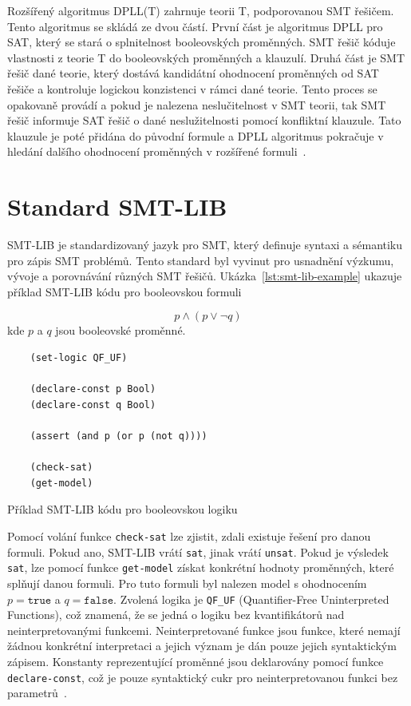 Rozšířený algoritmus DPLL(T) zahrnuje teorii T, podporovanou SMT řešičem.
Tento algoritmus se skládá ze dvou částí.
První část je algoritmus DPLL pro SAT, který se stará o splnitelnost booleovských proměnných.
SMT řešič kóduje vlastnosti z teorie T do booleovských proměnných a klauzulí.
Druhá část je SMT řešič dané teorie, který dostává kandidátní ohodnocení proměnných od SAT řešiče a kontroluje logickou konzistenci
v rámci dané teorie.
Tento proces se opakovaně provádí a pokud je nalezena neslučitelnost v SMT teorii,
tak SMT řešič informuje SAT řešič o dané neslužitelnosti pomocí konfliktní klauzule.
Tato klauzule je poté přidána do původní formule a DPLL algoritmus pokračuje v hledání dalšího ohodnocení proměnných
v rozšířené formuli~\cite{DPLLT}.




\section{Standard SMT-LIB}
\label{sec:smt-lib}

SMT-LIB je standardizovaný jazyk pro SMT, který definuje syntaxi a sémantiku pro zápis SMT problémů.
Tento standard byl vyvinut pro usnadnění výzkumu, vývoje a porovnávání různých SMT řešičů.
Ukázka~\ref{lst:smt-lib-example} ukazuje příklad SMT-LIB kódu pro booleovskou formuli

\begin{equation*}
    p \land (p \lor \neg q)
\end{equation*}
kde $p$ a $q$ jsou booleovské proměnné.

\begin{listing}[H]
    \begin{verbatim}
    (set-logic QF_UF)

    (declare-const p Bool)
    (declare-const q Bool)

    (assert (and p (or p (not q))))

    (check-sat)
    (get-model)
    \end{verbatim}
    \caption{Příklad SMT-LIB kódu pro booleovskou logiku}
    \label{lst:smt-lib-example}
\end{listing}

Pomocí volání funkce \texttt{check-sat} lze zjistit, zdali existuje řešení pro danou formuli.
Pokud ano, SMT-LIB vrátí \texttt{sat}, jinak vrátí \texttt{unsat}.
Pokud je výsledek \texttt{sat}, lze pomocí funkce \texttt{get-model} získat konkrétní hodnoty proměnných, které splňují danou formuli.
Pro tuto formuli byl nalezen model s ohodnocením $p = \texttt{true}$ a $q = \texttt{false}$.
Zvolená logika je \texttt{QF\_UF} (Quantifier-Free Uninterpreted Functions),
což znamená, že se jedná o logiku bez kvantifikátorů nad neinterpretovanými funkcemi.
Neinterpretované funkce jsou funkce, které nemají žádnou konkrétní interpretaci a jejich význam je dán pouze jejich syntaktickým zápisem.
Konstanty reprezentující proměnné jsou deklarovány pomocí funkce \texttt{declare-const},
což je pouze syntaktický cukr pro neinterpretovanou funkci bez parametrů~\cite{SMTLIB}.


